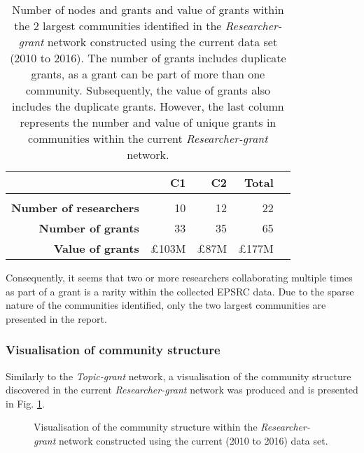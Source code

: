 \begin{table}[!htbp]
\centering
\caption[Number of nodes and grants and value of grants within the 2 largest communities in the \textit{Researcher-grant} network constructed using the current data set (2010 to 2016)]{Number of nodes and grants and value of grants within the 2 largest communities identified in the \textit{Researcher-grant} network constructed using the current data set (2010 to 2016). The number of grants includes duplicate grants, as a grant can be part of more than one community. Subsequently, the value of grants also includes the duplicate grants. However, the last column represents the number and value of unique grants in communities within the current \textit{Researcher-grant} network.}
\label{table:researcher_b_current_numbers}
\begin{tabular}{r|rrrr}
{} & \textbf{C1} & \textbf{C2} & \textbf{Total}\\
\hline\\
\textbf{Number of researchers} & {10} & {12} & {22}\\
\textbf{Number of grants}      & {33} & {35} & {65}\\
\textbf{Value of grants} & {\pounds103M} & {\pounds87M} & {\pounds177M}\\
\end{tabular}
\end{table}

Consequently, it seems that two or more researchers collaborating multiple times as part of a grant is a rarity within the collected EPSRC data. Due to the sparse nature of the communities identified, only the two largest communities are presented in the report.

\subsubsection{Visualisation of community structure}

Similarly to the \textit{Topic-grant} network, a visualisation of the community structure discovered in the current \textit{Researcher-grant} network was produced and is presented in Fig. \ref{figure:researcher_b_current_cs}.

\begin{figure}[htpb]
    \centering
    \caption[Visualisation of the community structure within the \textit{Researcher-grant} network constructed using the current (2010 to 2016) data set]{Visualisation of the community structure within the \textit{Researcher-grant} network constructed using the current (2010 to 2016) data set.}
    \label{figure:researcher_b_current_cs}
\end{figure}

